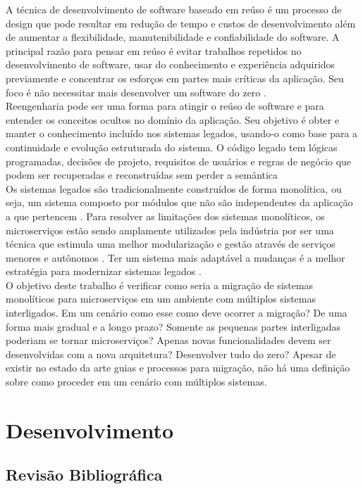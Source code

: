 \documentclass[12pt]{article}
\begin{document}
A técnica de desenvolvimento de software baseado em reúso é um processo de design que pode resultar em redução de tempo e custos de desenvolvimento além de aumentar a flexibilidade, manutenibilidade e confiabilidade do software. A principal razão para pensar em reúso é evitar trabalhos repetidos no desenvolvimento de software, usar do conhecimento e experiência adquiridos previamente e concentrar os esforços em partes mais críticas da aplicação. Seu foco é não necessitar mais desenvolver um software do zero \cite{Yang}.  
\\
Reengenharia pode ser uma forma para atingir o reúso de software e para entender os conceitos ocultos no domínio da aplicação. Seu objetivo é obter e manter o conhecimento incluído nos sistemas legados, usando-o como base para a continuidade e evolução estruturada do sistema. O código legado tem lógicas programadas, decisões de projeto, requisitos de usuários e regras de negócio que podem ser recuperadas e reconstruídas sem perder a semântica \cite{Garcia2004a}
\\
Os sistemas legados são tradicionalmente construídos de forma monolítica, ou seja, um sistema composto por módulos que não são independentes da aplicação a que pertencem \cite{Dragoni2017}. Para resolver as limitações dos sistemas monolíticos, os microserviços estão sendo amplamente utilizados pela indústria por ser uma técnica que estimula uma melhor modularização e gestão através de serviços menores e autônomos \cite{Carvalho2019}. Ter um sistema mais adaptável a mudanças é a melhor estratégia para modernizar sistemas legados \cite{Kamimura2019a}.
\\
O objetivo deste trabalho é verificar como seria a migração de sistemas monolíticos para microserviços em um ambiente com múltiplos sistemas interligados. Em um cenário como esse como deve ocorrer a migração? De uma forma mais gradual e a longo prazo? Somente as pequenas partes interligadas poderiam se tornar microserviços? Apenas novas funcionalidades devem ser desenvolvidas com a nova arquitetura? Desenvolver tudo do zero? Apesar de existir no estado da arte guias e processos para migração, não há uma definição sobre como proceder em um cenário com múltiplos sistemas. 

\section{Desenvolvimento} \label{sec:firstpage}

\subsection{Revisão Bibliográfica}
\end{document}
